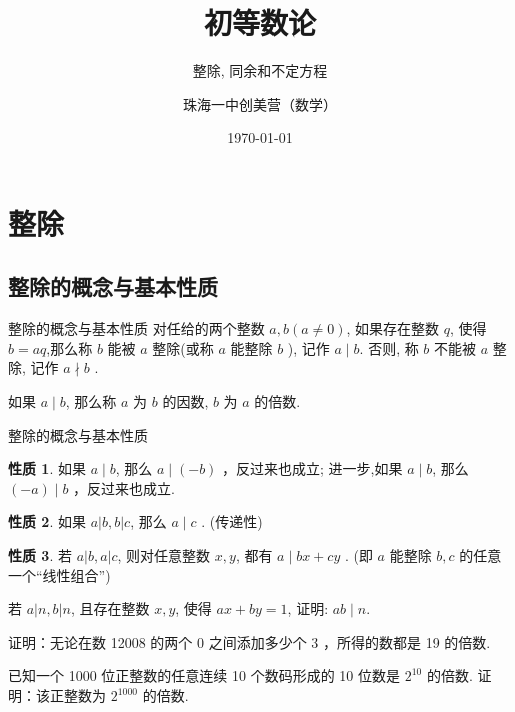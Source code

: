 \documentclass[aspectratio=169]{ctexbeamer}
\title[整除, 同余和不定方程]{初等数论}
\subtitle{整除, 同余和不定方程}
\author[珠海一中创美营]{珠海一中创美营（数学）}
\date[\today]{\today}
\theoremstyle{definition}
\newtheorem{property}{性质}[section]
\begin{document}
\frame{\titlepage}
\section{整除}
\subsection{整除的概念与基本性质}
\begin{frame}{整除的概念与基本性质}
	对任给的两个整数 $a ,  b(a \neq 0)$, 如果存在整数 $q$, 使得 $b=a q$,那么称 $b$ 能被 $a$ 整除(或称 $a$ 能整除 $b$ ), 记作 $a \mid b$. 否则, 称 $b$ 不能被 $a$ 整除, 记作 $a \nmid b$ .

	如果 $a \mid b$, 那么称 $a$ 为 $b$ 的因数, $b$ 为 $a$ 的倍数.
\end{frame}

\begin{frame}{整除的概念与基本性质}
	\begin{property}
		如果 $a \mid b$, 那么 $a \mid(-b)$ ，反过来也成立; 进一步,如果 $a \mid b$, 那么 $(-a) \mid b$ ，反过来也成立.
	\end{property}
	\pause
	\begin{property}
		如果 $a|b, b| c$, 那么 $a \mid c$ . (传递性)
	\end{property}
	\pause
	\begin{property}
		若 $a|b, a| c$, 则对任意整数 $x ,  y$, 都有 $a \mid b x+c y$ . (即 $a$ 能整除 $b ,  c$ 的任意一个“线性组合”)
	\end{property}
\end{frame}

\begin{frame}[t]
	\begin{example}
		若 $a|n, b| n$, 且存在整数 $x ,  y$, 使得 $a x+b y=1$, 证明: $a b \mid n$.
	\end{example}
\end{frame}

\begin{frame}[t]
	\begin{example}
		证明：无论在数 12008 的两个 0 之间添加多少个 3 ，所得的数都是 19 的倍数.
	\end{example}
\end{frame}

\begin{frame}[t]
	\begin{example}
		已知一个 1000 位正整数的任意连续 10 个数码形成的 10 位数是 $2^{10}$ 的倍数. 证明：该正整数为 $2^{1000}$ 的倍数.
	\end{example}
\end{frame}
\end{document}
